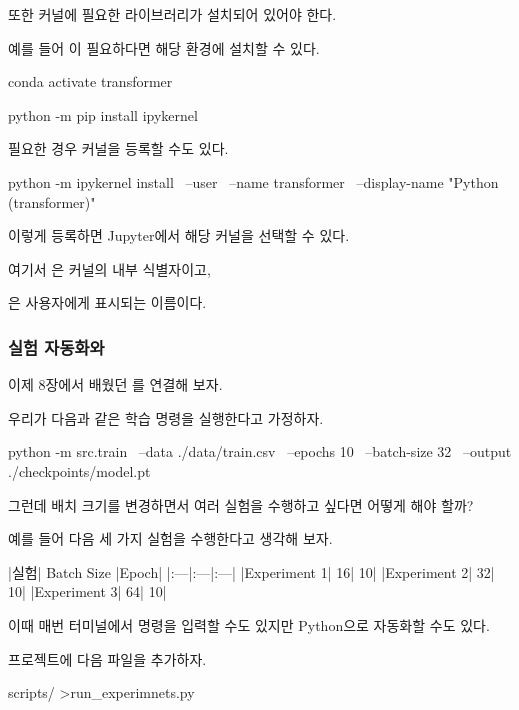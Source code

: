 또한 커널에 필요한 라이브러리가 설치되어 있어야 한다.

예를 들어 이 필요하다면 해당 환경에 설치할 수 있다.

\begin{dhkzsh}
conda activate transformer

python -m pip install ipykernel
\end{dhkzsh}

필요한 경우 커널을 등록할 수도 있다.

\begin{dhkzsh}
python -m ipykernel install \
    --user \
    --name transformer \
    --display-name "Python (transformer)"
\end{dhkzsh}

이렇게 등록하면 Jupyter에서 해당 커널을 선택할 수 있다.

여기서 은 커널의 내부 식별자이고,

은 사용자에게 표시되는 이름이다.

\subsubsection{실험 자동화와 }

이제 8장에서 배웠던 를 연결해 보자.

우리가 다음과 같은 학습 명령을 실행한다고 가정하자.

\begin{dhkzsh}
python -m src.train \
    --data ./data/train.csv \
    --epochs 10 \
    --batch-size 32 \
    --output ./checkpoints/model.pt
\end{dhkzsh}

그런데 배치 크기를 변경하면서 여러 실험을 수행하고 싶다면 어떻게 해야 할까?

예를 들어 다음 세 가지 실험을 수행한다고 생각해 보자.

\begin{dhktable}
|실험|	Batch Size	|Epoch|
|:---|:---|:---|
|Experiment 1|	16|	10|
|Experiment 2|	32|	10|
|Experiment 3|	64|	10|
\end{dhktable}

이때 매번 터미널에서 명령을 입력할 수도 있지만 Python으로 자동화할 수도 있다.

프로젝트에 다음 파일을 추가하자.

\begin{dhkdir}[in=6]
scripts/
>run_experimnets.py
\end{dhkdir}

